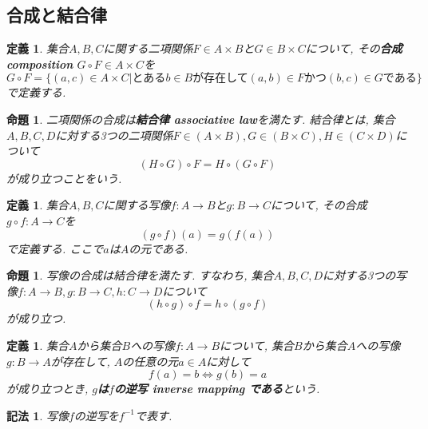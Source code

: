 \documentclass[dvipdfmx]{jsbook}
\theoremstyle{plain}
\newtheorem{Def}[thm]{定義}
\newtheorem{Notation}[thm]{記法}
\newtheorem{Prop}[thm]{命題}
\begin{document}
\subsection{合成と結合律}
\begin{Def}
集合$A,B,C$に関する二項関係$F\in A\times B$と$G\in B\times C$について, その{\bf 合成 composition} $G\circ F\in A\times C$を
\[
G\circ F=\{(a,c)\in A\times C|\text{とある}b\in B\text{が存在して}(a,b)\in F \text{かつ} (b,c)\in G\text{である}\}
\]
で定義する.
\end{Def}
\begin{Prop}
二項関係の合成は{\bf 結合律 associative law}を満たす.
結合律とは, 集合$A,B,C,D$に対する3つの二項関係$F\in(A\times B),G\in(B\times C),H\in(C\times D)$について
\[
(H\circ G)\circ F=H\circ (G\circ F)
\]
が成り立つことをいう.
\end{Prop}

\begin{Def}
集合$A,B,C$に関する写像$f:A\rightarrow B$と$g:B\rightarrow C$について, その合成 $g\circ f:A\rightarrow C$を
\[
(g\circ f)(a)=g(f(a))
\]
で定義する. ここで$a$は$A$の元である.
\end{Def}
\begin{Prop}
写像の合成は結合律を満たす.
すなわち, 集合$A,B,C,D$に対する3つの写像$f:A\rightarrow B, g:B\rightarrow C,
h:C\rightarrow D$について
\[
(h\circ g)\circ f=h\circ(g\circ f)
\]
が成り立つ.
\end{Prop}

\begin{Def}
集合$A$から集合$B$への写像$f:A\rightarrow B$について, 集合$B$から集合$A$への写像$g:B\rightarrow A$が存在して, $A$の任意の元$a\in A$に対して
\[
f(a)=b \Leftrightarrow g(b)=a
\]
が成り立つとき, {\bf $g$は$f$の逆写 inverse mapping である}という.
\end{Def}
\begin{Notation}
写像$f$の逆写を$f^{-1}$で表す.
\end{Notation}

\begin{comment}
************************************
\begin{Def}
部分関数の合成
\end{Def}

\begin{Prop}
部分関数の合成は結合律を満たす.
\end{Prop}
************************************
\end{comment}
\end{document}
